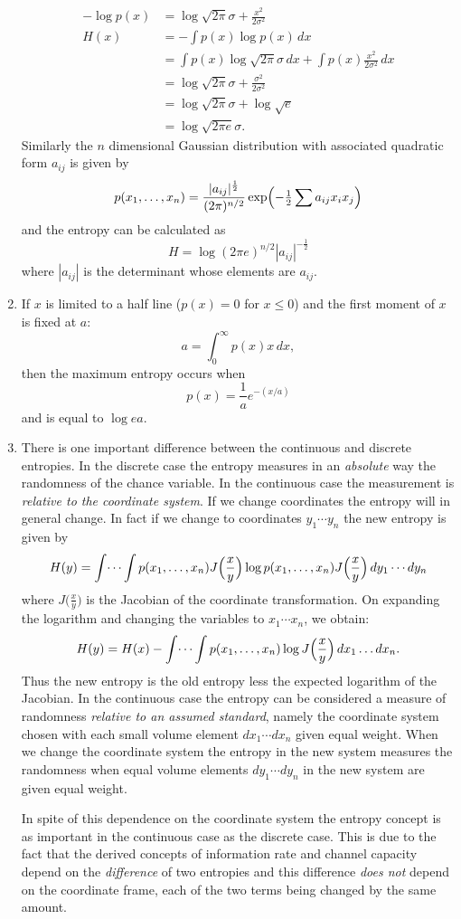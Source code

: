 \begin{enumerate}
\begin{align*}
-\log p(x)&=\log\sqrt{2\pi}\sigma+\frac{x^2}{2\sigma^2}\\
H(x)&=-\int p(x)\log p(x)\,dx\\
	&=\int p(x)\log\sqrt{2\pi}\sigma\,dx
		+\int p(x)\frac{x^2}{2\sigma^2}\,dx\\
	&=\log\sqrt{2\pi}\sigma+\frac{\sigma^2}{2\sigma^2}\\
	&=\log\sqrt{2\pi}\sigma+\log\sqrt{e}\\
	&=\log\sqrt{2\pi e}\sigma.
\end{align*}
Similarly the $n$ dimensional Gaussian distribution with associated quadratic
form $a_{ij}$ is given by
$$
p(x_1,\dots,x_n)=\frac{|a_{ij}|^{\frac12}}{(2\pi)^{n/2}}
	\exp\Bigl(-\tfrac12\sum a_{ij} x_i x_j\Bigr)
$$
and the entropy can be calculated as
$$
H=\log(2\pi e)^{n/2}|a_{ij}|^{-\frac12}
$$
where $|a_{ij}|$ is the determinant whose elements are $a_{ij}$.
\item
If $x$ is limited to a half line ($p(x)=0$ for $x\leq0$) and the first
moment of $x$ is fixed at $a$:
$$
a=\int_0^\infty p(x)x\,dx,
$$
then the maximum entropy occurs when
$$
p(x)=\frac1a e^{-(x/a)}
$$
and is equal to $\log ea$.
\item
There is one important difference between the continuous and discrete
entropies.  In the discrete case the entropy measures in an \emph{absolute}
way the randomness of the chance variable.  In the continuous case the
measurement is \emph{relative to the coordinate system}.  If we change
coordinates the entropy will in general change.  In fact if we
change to coordinates $y_1\dotsm y_n$ the new entropy is given by
$$
H(y)=\int\dots\int p(x_1,\dots,x_n)J\Bigl(\frac x y\Bigr)
	\log  p(x_1,\dots,x_n)J\Bigl(\frac x y\Bigr)\,dy_1\dotsm dy_n
$$
where $J\bigl(\frac x y\bigr)$ is the Jacobian of the
coordinate transformation.  On expanding the logarithm and changing the
variables to $x_1\dotsm x_n$, we obtain:
$$
H(y)=H(x)-\int\dots\int p(x_1,\dots,x_n)\log J\Bigl(\frac x y\Bigr)\,
	dx_1\dots dx_n.
$$
Thus the new entropy is the old entropy less the expected logarithm of
the Jacobian.  In the continuous case the entropy can be considered a
measure of randomness \emph{relative to an assumed standard}, namely the
coordinate system chosen with each small volume element $dx_1\dotsm dx_n$
given equal weight.  When we change the coordinate system the entropy in
the new system measures the randomness when equal volume elements
$dy_1\dotsm dy_n$ in the new system are given equal weight.

In spite of this dependence on the coordinate system the entropy concept
is as important in the continuous case as the discrete case.  This is
due to the fact that the derived concepts of information rate and
channel capacity depend on the \emph{difference} of two entropies
and this difference \emph{does not} depend on the coordinate frame, each
of the two terms being changed by the same amount.


\end{enumerate}
